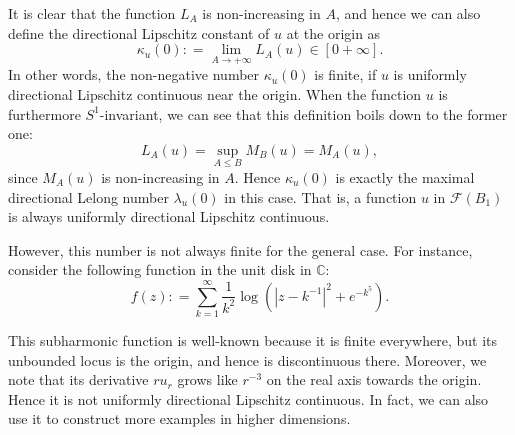 \documentclass[a4paper,11pt]{amsart}
\numberwithin{equation}{section}
\def\cF{{\mathcal F}}
\def\bC{{\mathbb C}}
\def\k{{\kappa}}
\begin{document}
It is clear that the function $L_A$ is non-increasing in $A$,
and hence we can also define the directional Lipschitz constant 
of $u$ at the origin as
$$ \k_u(0): = \lim_{A\rightarrow +\infty}  L_A (u) \in [0 +\infty]. $$
In other words, the non-negative number $\k_u(0)$ is finite, if $u$ 
is uniformly directional Lipschitz continuous near the origin. 
When the function $u$ is furthermore $S^1$-invariant, 
we can see that this definition boils down to the former one:
\begin{equation}
\label{gc-0050}
 L_A(u) = \sup_{A\leq B} M_B(u) = M_A(u), 
 \end{equation}
since $M_A(u)$ is non-increasing in $A$.
Hence $\k_u(0)$ is exactly the maximal directional Lelong number $\lambda_u(0)$ in this case.
That is, a function $u$ in $\cF(B_1)$ is always uniformly directional Lipschitz continuous. 


However, this number is not always finite for the general case. 
For instance, consider the following function in the unit disk in $\bC$: 
\begin{equation}
\label{gc-005}
f(z): = \sum_{k=1}^{\infty} \frac{1}{k^2} \log \left( | z - k^{-1} |^2 + e^{-k^5} \right). 
\end{equation}

This subharmonic function is well-known because it is finite everywhere,
but its unbounded locus is the origin, and hence is discontinuous there. 
Moreover, we note that 
its derivative $ru_r$ grows like 
$r^{-3}$ on the real axis towards the origin.  
Hence it is not uniformly directional Lipschitz continuous. 
In fact, 
we can also use it to construct more examples in higher dimensions. 
\end{document}
